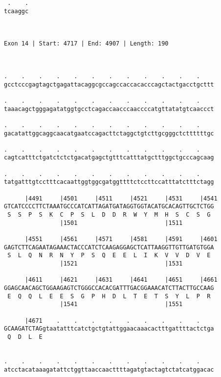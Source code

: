 \documentclass{article}
\begin{document}
\begin{Verbatim}
 .    .
tcaaggc
       
       
 
Exon 14 | Start: 4717 | End: 4907 | Length: 190



.    .    .    .    .    .    .    .    .    .    .    .    
gcctcccgagtagctgagattacaggcgccagccaccacacccagctactgacctgcttt
                                                            
.    .    .    .    .    .    .    .    .    .    .    .    
taaacagctgggagatatggtgcctcagaccaacccaaccccatgttatatgtcaaccct
                                                            
.    .    .    .    .    .    .    .    .    .    .    .    
gacatattggcaggcaacatgaatccagacttctaggctgtcttgcgggctcttttttgc
                                                            
.    .    .    .    .    .    .    .    .    .    .    .    
cagtcatttctgatctctctgacatgagctgtttcatttatgctttggctgcccagcaag
                                                            
.    .    .    .    .    .    .    .    .    .    .    .    
tatgatttgtcctttcacaattggtggcgatggttttctccttccatttatctttctagg
                                                            
      |4491     |4501     |4511     |4521     |4531     |4541
GTCATCCCCTTCTAAATGCCCATCATTAGATGATAGGTGGTACATGCACAGTTGCTCTGG
 S  S  P  S  K  C  P  S  L  D  D  R  W  Y  M  H  S  C  S  G 
                |1501                         |1511         
  
      |4551     |4561     |4571     |4581     |4591     |4601
GAGTCTTCAGAATAGAAACTACCCATCTCAAGAGGAGCTCATTAAGGTTGTTGATGTGGA
 S  L  Q  N  R  N  Y  P  S  Q  E  E  L  I  K  V  V  D  V  E 
                |1521                         |1531         
  
      |4611     |4621     |4631     |4641     |4651     |4661
GGAGCAACAGCTGGAAGAGTCTGGGCCACACGATTTGACGGAAACATCTTACTTGCCAAG
 E  Q  Q  L  E  E  S  G  P  H  D  L  T  E  T  S  Y  L  P  R 
                |1541                         |1551         
  
      |4671    .    .    .    .    .    .    .    .    .    
GCAAGATCTAGgtaatatttcatctgctgtattggaacaaacactttgattttactctga
 Q  D  L  E                                                 
                                                            
  
.    .    .    .    .    .    .    .    .    .    .    .    
atcctacataaagatattctggttaaccaacttttagatgtactagtctatcatggacac
                                                            

\end{Verbatim}
\end{document}
